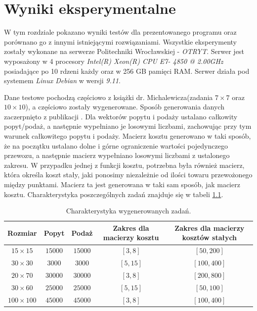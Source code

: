\chapter{Wyniki eksperymentalne}
\thispagestyle{chapterBeginStyle}
\label{rozdzial3}

W tym rozdziale pokazano wyniki testów dla prezentowanego programu oraz porównano go z innymi istniejącymi rozwiązaniami. 
Wszystkie eksperymenty zostały wykonane na serwerze Politechniki Wrocławskiej - \textit{OTRYT}. Serwer jest wyposażony w 4 procesory 
\textit{Intel(R) Xeon(R) CPU E7- 4850  @ 2.00GHz} posiadające po 10 rdzeni każdy oraz w 256 GB pamięci RAM. Serwer działa pod systemem 
\textit{Linux Debian} w wersji \textit{9.11}.

Dane testowe pochodzą częściowo z książki dr. Michalewicza(zadania $7 \times 7$ oraz $10 \times 10$)\cite{ALG-GEN-BOOK}, a częściowo 
zostały wygenerowane. Sposób generowania danych zaczerpnięto z publikacji \cite{GEN-TEST-DATA}. Dla wektorów popytu i podaży ustalano 
całkowity popyt/podaż, a następnie wypełniano je losowymi liczbami, zachowując przy tym warunek całkowitego popytu i podaży. 
Macierz kosztu generowano w taki sposób, że na początku ustalano dolne i górne ograniczenie wartości pojedynczego przewozu, a następnie 
macierz wypełniano losowymi liczbami z ustalonego zakresu. W przypadku jednej z funkcji kosztu, potrzebna była również macierz, która 
określa koszt stały, jaki ponosimy niezależnie od ilości towaru przewożonego między punktami. Macierz ta jest generowana w taki sam 
sposób, jak macierz kosztu. Charakterystyka poszczególnych zadań znajduje się w tabeli \ref{specyfika-zadan}.

\begin{table}[H]
    \begin{center}
        \begin{tabular}{c|c|c|c|c}
            Rozmiar & Popyt & Podaż & Zakres dla macierzy kosztu & Zakres dla macierzy kosztów stałych \\ 
            \hline
            $15 \times 15$ & $15000$ & $15000$ & $[3, 8]$ & $[50, 200]$ \\
            $30 \times 30$ & $3000$ & $3000$ & $[5, 15]$ & $[100, 400]$ \\
            $20 \times 70$ & $30000$ & $30000$ & $[3, 8]$ & $[200, 800]$ \\
            $30 \times 60$ & $25000$ & $25000$ & $[5, 15]$ & $[50, 100]$ \\
            $100 \times 100$ & $45000$ & $45000$ & $[3, 8]$ & $[100, 400]$ \\
        \end{tabular}
    \end{center}
    \caption{Charakterystyka wygenerowanych zadań.}
    \label{specyfika-zadan}
\end{table}


